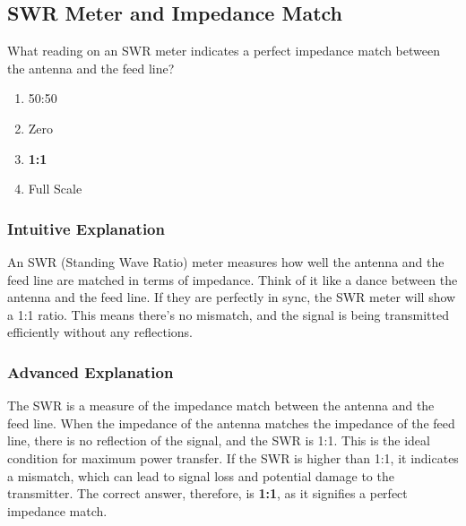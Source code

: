 \subsection{SWR Meter and Impedance Match}
\label{T7C04}

\begin{tcolorbox}[colback=gray!10!white,colframe=black!75!black,title=T7C04]
What reading on an SWR meter indicates a perfect impedance match between the antenna and the feed line?
\begin{enumerate}[noitemsep]
    \item 50:50
    \item Zero
    \item \textbf{1:1}
    \item Full Scale
\end{enumerate}
\end{tcolorbox}

\subsubsection*{Intuitive Explanation}
An SWR (Standing Wave Ratio) meter measures how well the antenna and the feed line are matched in terms of impedance. Think of it like a dance between the antenna and the feed line. If they are perfectly in sync, the SWR meter will show a 1:1 ratio. This means there’s no mismatch, and the signal is being transmitted efficiently without any reflections.

\subsubsection*{Advanced Explanation}
The SWR is a measure of the impedance match between the antenna and the feed line. When the impedance of the antenna matches the impedance of the feed line, there is no reflection of the signal, and the SWR is 1:1. This is the ideal condition for maximum power transfer. If the SWR is higher than 1:1, it indicates a mismatch, which can lead to signal loss and potential damage to the transmitter. The correct answer, therefore, is \textbf{1:1}, as it signifies a perfect impedance match.